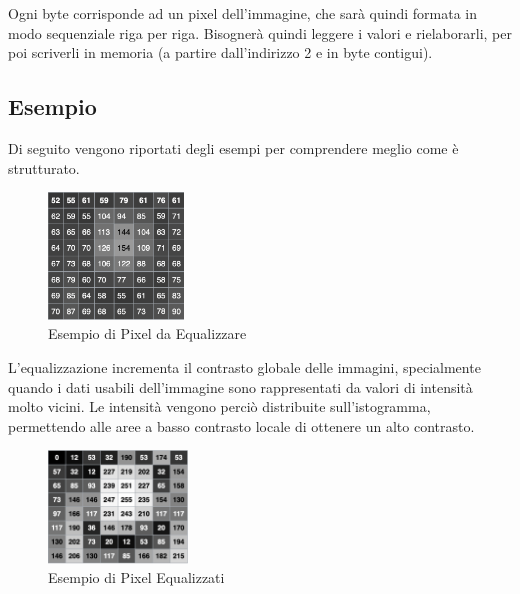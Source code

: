 \documentclass{article}
\begin{document}
Ogni byte corrisponde ad un pixel dell’immagine, che sarà quindi formata in modo sequenziale riga per riga. Bisognerà quindi leggere i valori e rielaborarli, per poi scriverli in memoria (a partire dall’indirizzo 2 e in byte contigui).
\subsection{Esempio} 
Di seguito vengono riportati degli esempi per comprendere meglio come è strutturato.
\begin{figure}[h]
\centering
\includegraphics[width=0.32\textwidth]{BeforeEq.png}
\caption{Esempio di Pixel da Equalizzare}
\end{figure}
L'equalizzazione incrementa il contrasto globale delle immagini, specialmente quando i dati usabili dell'immagine sono rappresentati da valori di intensità molto vicini. Le intensità vengono perciò distribuite sull'istogramma, permettendo alle aree a basso contrasto locale di ottenere un alto contrasto.\newline
\begin{figure}[h]
\centering
\includegraphics[width=0.33\textwidth]{AfterEq.png}
\caption{Esempio di Pixel Equalizzati}
\end{figure}


\break
\end{document}
